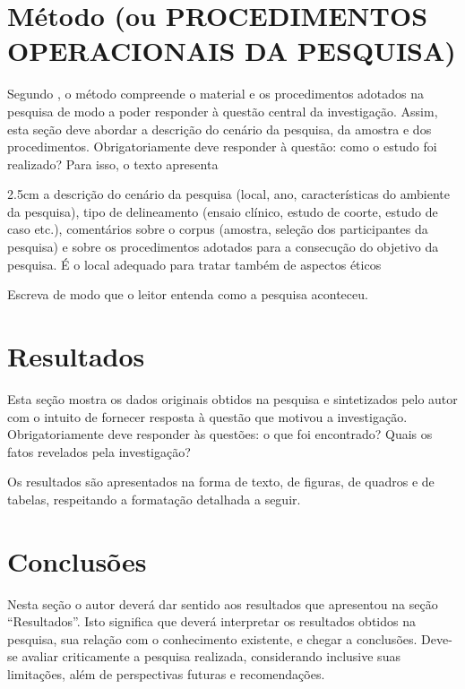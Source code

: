 \documentclass[%
  article,%
  a4paper,%
  11pt,%
  fleqn,%
  oneside,%
  chapter = TITLE,%
  section = TITLE,%
]{abntex2}
\newcounter{quadro}[section]
\begin{document}
\section{Método (ou PROCEDIMENTOS OPERACIONAIS DA PESQUISA)}\label{sec:metod}

\par Segundo \textcite{PEREIRA_2018}, o método compreende o material e os procedimentos adotados na pesquisa de modo a poder responder à questão central da investigação. Assim, esta seção deve abordar a descrição do cenário da pesquisa, da amostra e dos procedimentos. Obrigatoriamente deve responder à questão: como o estudo foi realizado? Para isso, o texto apresenta

\begin{adjustwidth}{2.5cm}{}
a descrição do cenário da pesquisa (local, ano, características do ambiente da pesquisa), tipo de delineamento (ensaio clínico, estudo de coorte, estudo de caso etc.), comentários sobre o corpus (amostra, seleção dos participantes da pesquisa) e sobre os procedimentos adotados para a consecução do objetivo da pesquisa. É o local adequado para tratar também de aspectos éticos \cite[p.~59]{MEDEIROS_2021}
\end{adjustwidth}
\par Escreva de modo que o leitor entenda como a pesquisa aconteceu.  

\section{Resultados}\label{sec:resul}

\par Esta seção mostra os dados originais obtidos na pesquisa e sintetizados pelo autor com o intuito de fornecer resposta à questão que motivou a investigação. Obrigatoriamente deve responder às questões: o que foi encontrado? Quais os fatos revelados pela investigação?
\par Os resultados são apresentados na forma de texto, de figuras, de quadros e de tabelas, respeitando a formatação detalhada a seguir.

\section{Conclusões}\label{sec:concl}
Nesta seção o autor deverá dar sentido aos resultados que apresentou na seção “Resultados”. Isto significa que deverá interpretar os resultados obtidos na pesquisa, sua relação com o conhecimento existente, e chegar a conclusões. Deve-se avaliar criticamente a pesquisa realizada, considerando inclusive suas limitações, além de perspectivas futuras e recomendações.
\end{document}
